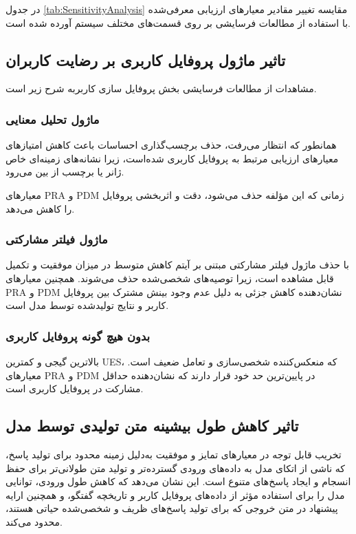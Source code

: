 در جدول 
\ref{tab:SensitivityAnalysis}
مقایسه تغییر مقادیر معیارهای ارزیابی معرفی‌شده با استفاده از مطالعات فرسایشی بر روی قسمت‌های مختلف سیستم آورده شده است.






\subsection{تاثیر ماژول پروفایل کاربری بر رضایت کاربران}
مشاهدات از مطالعات فرسایشی بخش پروفایل سازی کاربربه شرح زیر است.

\subsubsection{ماژول تحلیل معنایی}

همانطور که انتظار می‌رفت، حذف برچسب‌گذاری احساسات باعث کاهش امتیازهای معیارهای ارزیابی مرتبط به پروفایل کاربری شده‌است، زیرا نشانه‌های زمینه‌ای خاص ژانر یا برچسب از بین می‌رود.

معیارهای PRA و PDM زمانی که این مؤلفه حذف می‌شود، دقت و اثربخشی پروفایل را کاهش می‌دهد. 

\subsubsection{ماژول فیلتر مشارکتی}

با حذف ماژول فیلتر مشارکتی مبتنی بر آیتم کاهش متوسط ​​در میزان موفقیت و تکمیل قابل مشاهده است، زیرا توصیه‌های شخصی‌شده حذف می‌شوند.
همچنین معیارهای PRA و PDM نشان‌دهنده کاهش جزئی به دلیل عدم وجود بینش مشترک بین پروفایل کاربر و نتایج تولیدشده توسط مدل است.

\subsubsection{بدون هیچ‌ گونه پروفایل کاربری}

بالاترین گیجی و کمترین UES، که منعکس‌کننده شخصی‌سازی و تعامل ضعیف است. معیارهای PRA و PDM در پایین‌ترین حد خود قرار دارند که نشان‌دهنده حداقل مشارکت در پروفایل کاربری است.

\subsection{تاثیر کاهش طول بیشینه متن تولیدی توسط مدل}

تخریب قابل توجه در معیارهای تمایز و موفقیت به‌دلیل زمینه محدود برای تولید پاسخ، که ناشی از اتکای مدل به داده‌های ورودی گسترده‌تر و تولید متن طولانی‌تر برای حفظ انسجام و ایجاد پاسخ‌های متنوع است. این نشان می‌دهد که کاهش طول ورودی، توانایی مدل را برای استفاده مؤثر از داده‌های پروفایل کاربر و تاریخچه گفتگو، و همچنین ارایه پیشنهاد در متن خروجی که برای تولید پاسخ‌های ظریف و شخصی‌شده حیاتی هستند، محدود می‌کند.


